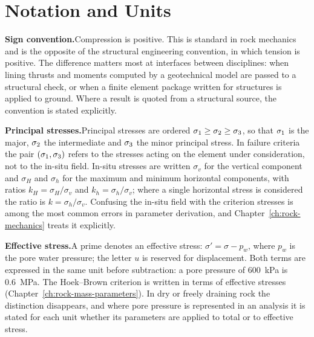 \chapter*{Notation and Units}
{}
\label{ch:notation}

\noindent\textbf{Sign convention.}\enspace Compression is positive. This is
standard in rock mechanics and is the opposite of the structural
engineering convention, in which tension is positive. The difference matters
most at interfaces between disciplines: when lining thrusts and moments
computed by a geotechnical model are passed to a structural check, or when a
finite element package written for structures is applied to ground. Where a
result is quoted from a structural source, the convention is stated
explicitly.

\noindent\textbf{Principal stresses.}\enspace Principal stresses are ordered
$\sigma_1 \geq \sigma_2 \geq \sigma_3$, so that $\sigma_1$ is the major, $\sigma_2$ the
intermediate and $\sigma_3$ the minor principal stress. In failure criteria the
pair $(\sigma_1, \sigma_3)$ refers to the stresses acting on the element under
consideration, not to the in-situ field. In-situ stresses are written
$\sigma_v$ for the vertical component and $\sigma_H$ and $\sigma_h$ for the
maximum and minimum horizontal components, with ratios
$k_H = \sigma_H/\sigma_v$ and $k_h = \sigma_h/\sigma_v$; where a single
horizontal stress is considered the ratio is $k = \sigma_h / \sigma_v$. Confusing
the in-situ field with the criterion stresses is among the most common errors
in parameter derivation, and Chapter~\ref{ch:rock-mechanics} treats it
explicitly.

\noindent\textbf{Effective stress.}\enspace A prime denotes an effective
stress: $\sigma' = \sigma - p_w$, where $p_w$ is the pore water pressure; the
letter $u$ is reserved for displacement. Both terms are expressed in the same
unit before subtraction: a pore pressure of \SI{600}{\kilo\pascal} is
\SI{0.6}{\mega\pascal}. The Hoek--Brown criterion is written in terms of
effective stresses (Chapter~\ref{ch:rock-mass-parameters}). In dry or freely draining rock the
distinction disappears, and where pore pressure is represented in an
analysis it is stated for each unit whether its parameters are applied to
total or to effective stress.

